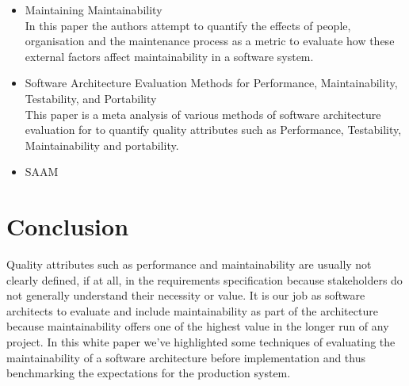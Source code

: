 \documentclass[dvips,12pt]{article}
\begin{document}
\begin{itemize}
\item Maintaining Maintainability \cite{ramage_maintaining_1998}\\
In this paper the authors attempt to quantify the effects of people, organisation and the maintenance process as a metric to evaluate how these external factors affect maintainability in a software system.

\item Software Architecture Evaluation Methods for Performance, Maintainability, Testability, and Portability \cite{mattsson_software_2006}\\
This paper is a meta analysis of various methods of software architecture evaluation for to quantify quality attributes such as Performance, Testability, Maintainability and portability.

\item SAAM \cite{kazman_saam:_1994}

\end{itemize}

\section{Conclusion}
Quality attributes such as performance and maintainability are usually not clearly defined, if at all, in the requirements specification because stakeholders do not generally understand their necessity or value. It is our job as software architects to evaluate and include maintainability as part of the architecture because maintainability offers one of the highest value in the longer run of any project. In this white paper we've highlighted some techniques of evaluating the maintainability of a software architecture before implementation and thus benchmarking the expectations for the production system.
\end{document}
